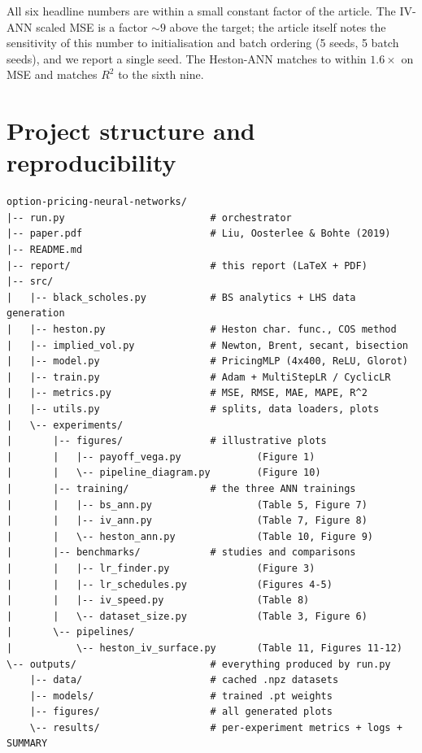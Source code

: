 \documentclass[11pt,a4paper]{article}
\begin{document}
All six headline numbers are within a small constant factor of the article.
The IV-ANN scaled MSE is a factor $\sim 9$ above the target; the article
itself notes the sensitivity of this number to initialisation and batch
ordering (5 seeds, 5 batch seeds), and we report a single seed. The
Heston-ANN matches to within $1.6\times$ on MSE and matches $R^2$ to the
sixth nine.

\section{Project structure and reproducibility}

\begin{verbatim}
option-pricing-neural-networks/
|-- run.py                         # orchestrator
|-- paper.pdf                      # Liu, Oosterlee & Bohte (2019)
|-- README.md
|-- report/                        # this report (LaTeX + PDF)
|-- src/
|   |-- black_scholes.py           # BS analytics + LHS data generation
|   |-- heston.py                  # Heston char. func., COS method
|   |-- implied_vol.py             # Newton, Brent, secant, bisection
|   |-- model.py                   # PricingMLP (4x400, ReLU, Glorot)
|   |-- train.py                   # Adam + MultiStepLR / CyclicLR
|   |-- metrics.py                 # MSE, RMSE, MAE, MAPE, R^2
|   |-- utils.py                   # splits, data loaders, plots
|   \-- experiments/
|       |-- figures/               # illustrative plots
|       |   |-- payoff_vega.py             (Figure 1)
|       |   \-- pipeline_diagram.py        (Figure 10)
|       |-- training/              # the three ANN trainings
|       |   |-- bs_ann.py                  (Table 5, Figure 7)
|       |   |-- iv_ann.py                  (Table 7, Figure 8)
|       |   \-- heston_ann.py              (Table 10, Figure 9)
|       |-- benchmarks/            # studies and comparisons
|       |   |-- lr_finder.py               (Figure 3)
|       |   |-- lr_schedules.py            (Figures 4-5)
|       |   |-- iv_speed.py                (Table 8)
|       |   \-- dataset_size.py            (Table 3, Figure 6)
|       \-- pipelines/
|           \-- heston_iv_surface.py       (Table 11, Figures 11-12)
\-- outputs/                       # everything produced by run.py
    |-- data/                      # cached .npz datasets
    |-- models/                    # trained .pt weights
    |-- figures/                   # all generated plots
    \-- results/                   # per-experiment metrics + logs + SUMMARY
\end{verbatim}
\end{document}
